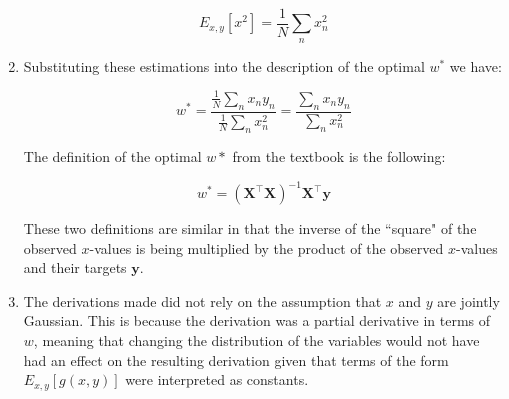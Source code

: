 \documentclass[submit]{harvardml}
\begin{document}
\begin{enumerate}
\begin{equation*}
    E_{x,y}[x^2] = \frac{1}{N} \sum_n x_n^2
\end{equation*}

\item

Substituting these estimations into the description of the optimal $w^*$ we have:

\begin{equation*}
    w^* = \frac{\frac{1}{N} \sum_n x_n y_n}{\frac{1}{N} \sum_n x_n^2}
    = \frac{\sum_n x_n y_n}{\sum_n x_n^2}
\end{equation*}

The definition of the optimal $w*$ from the textbook is the following:

\begin{equation*}
    w^* = (\mathbf{X}^\top \mathbf{X})^{-1} \mathbf{X}^\top \mathbf{y}
\end{equation*}

These two definitions are similar in that the inverse of the ``square" of the
observed $x$-values is being multiplied by the product of the observed $x$-values 
and their targets $\mathbf{y}$.

\item

The derivations made did not rely on the assumption that $x$ and $y$ are jointly Gaussian.
This is because the derivation was a partial derivative in terms of $w$, meaning that changing 
the distribution of the variables would not have had an effect on the resulting derivation 
given that terms of the form $E_{x,y}[g(x,y)]$ were interpreted as constants.

\end{enumerate}


\end{document}
